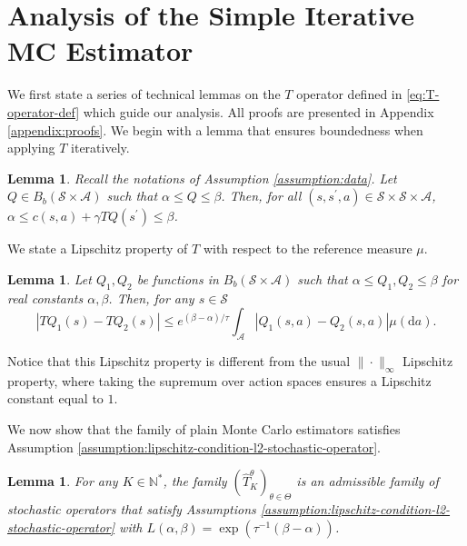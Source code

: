 \documentclass[11pt]{article}
\numberwithin{equation}{section}
\newtheorem{lemma}[theorem]{Lemma}
\theoremstyle{definition}
\theoremstyle{remark}
\def\diff{{\mathrm{d}}}
\def\N{{\mathbb{N}}}
\begin{document}
\section{Analysis of the Simple Iterative MC Estimator}
\label{sec:proof-simple-iterative-MC}

We first state a series of technical lemmas on the $T$ operator defined in \eqref{eq:T-operator-def} which guide our analysis. All proofs are presented in Appendix \ref{appendix:proofs}.
We begin with a lemma that ensures boundedness when applying $T$ iteratively.
\begin{lemma}
    \label{lemma:boundedness-of-iterates}
    Recall the notations of Assumption \ref{assumption:data}. Let $Q \in B_b(\mathcal S \times \mathcal A)$ such that $ \alpha \leq Q \leq \beta$. Then, for all $(s,s^\prime,a) \in \mathcal S \times \mathcal S \times \mathcal A$, $\alpha \leq c(s,a) + \gamma  TQ (s^\prime) \leq \beta$.
\end{lemma}


We state a Lipschitz property of $T$ with respect to the reference measure $\mu$.
\begin{lemma}
    \label{lemma:contraction-prop-T-l2}
    Let $Q_1,Q_2$ be functions in $B_b(\mathcal S \times \mathcal A)$ such that $\alpha \leq Q_1,Q_2 \leq \beta$ for real constants $\alpha, \beta$. Then, for any $s \in \mathcal S$
    \begin{equation*}
        \label{eq:contraction-prop-T-l2}
        \left|TQ_1(s) - TQ_2(s) \right| \leq e^{(\beta - \alpha)/ \tau} \int_{\mathcal A} \left| Q_1(s,a) - Q_2(s,a)  \right| \mu (\diff a).
    \end{equation*}
\end{lemma}
Notice that this Lipschitz property is different from the usual $\|\cdot\|_{\infty}$ Lipschitz property, where taking the supremum over action spaces ensures a Lipschitz constant equal to $1$.


We now show that the family of plain Monte Carlo estimators satisfies Assumption \ref{assumption:lipschitz-condition-l2-stochastic-operator}.
\begin{lemma}
    \label{lemma:contraction-prop-T-hat-l2}
    For any $K \in \N^*$, the family $(\hat{T}^\theta_K)_{\theta \in \Theta}$ is an admissible family of stochastic operators that satisfy Assumptions \ref{assumption:lipschitz-condition-l2-stochastic-operator} with $L(\alpha, \beta) = \exp(\tau^{-1}(\beta - \alpha))$.
\end{lemma}
\end{document}
